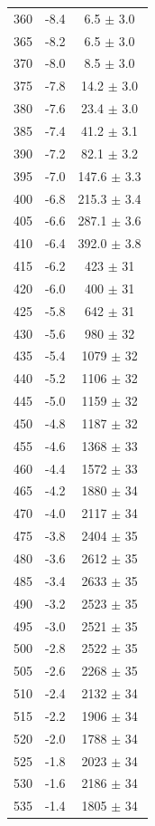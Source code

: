 \documentclass[a4paper,12pt]{article}
\begin{document}
\begin{center}
\begin{longtable}{|c|c|c|}
360 & -8.4 & 6.5 $\pm$  3.0 \\ 
365 & -8.2 & 6.5 $\pm$  3.0 \\ 
370 & -8.0 & 8.5 $\pm$  3.0 \\ 
375 & -7.8 & 14.2 $\pm$  3.0 \\ 
380 & -7.6 & 23.4 $\pm$  3.0 \\ 
385 & -7.4 & 41.2 $\pm$  3.1 \\ 
390 & -7.2 & 82.1 $\pm$  3.2 \\ 
395 & -7.0 & 147.6 $\pm$  3.3 \\ 
400 & -6.8 & 215.3 $\pm$  3.4 \\ 
405 & -6.6 & 287.1 $\pm$  3.6 \\ 
410 & -6.4 & 392.0 $\pm$  3.8 \\ 
415 & -6.2 & 423 $\pm$  31 \\ 
420 & -6.0 & 400 $\pm$  31 \\ 
425 & -5.8 & 642 $\pm$  31 \\ 
430 & -5.6 & 980 $\pm$  32 \\ 
435 & -5.4 & 1079 $\pm$  32 \\ 
440 & -5.2 & 1106 $\pm$  32 \\ 
445 & -5.0 & 1159 $\pm$  32 \\ 
450 & -4.8 & 1187 $\pm$  32 \\ 
455 & -4.6 & 1368 $\pm$  33 \\ 
460 & -4.4 & 1572 $\pm$  33 \\ 
465 & -4.2 & 1880 $\pm$  34 \\ 
470 & -4.0 & 2117 $\pm$  34 \\ 
475 & -3.8 & 2404 $\pm$  35 \\ 
480 & -3.6 & 2612 $\pm$  35 \\ 
485 & -3.4 & 2633 $\pm$  35 \\ 
490 & -3.2 & 2523 $\pm$  35 \\ 
495 & -3.0 & 2521 $\pm$  35 \\ 
500 & -2.8 & 2522 $\pm$  35 \\ 
505 & -2.6 & 2268 $\pm$  35 \\ 
510 & -2.4 & 2132 $\pm$  34 \\ 
515 & -2.2 & 1906 $\pm$  34 \\ 
520 & -2.0 & 1788 $\pm$  34 \\ 
525 & -1.8 & 2023 $\pm$  34 \\ 
530 & -1.6 & 2186 $\pm$  34 \\ 
535 & -1.4 & 1805 $\pm$  34 \\ 

\end{longtable}
\end{center}
\end{document}
